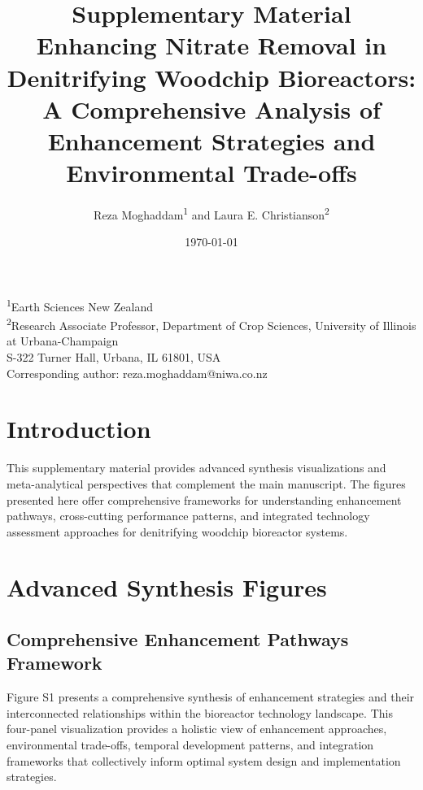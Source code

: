 \documentclass[12pt,a4paper]{article}
\title{Supplementary Material\\
\large Enhancing Nitrate Removal in Denitrifying Woodchip Bioreactors: A Comprehensive Analysis of Enhancement Strategies and Environmental Trade-offs}
\author{Reza Moghaddam\textsuperscript{1} and Laura E. Christianson\textsuperscript{2}}
\date{\today}
\begin{document}
\maketitle

\begin{center}
\footnotesize
\textsuperscript{1}Earth Sciences New Zealand\\
\textsuperscript{2}Research Associate Professor, Department of Crop Sciences, University of Illinois at Urbana-Champaign\\
S-322 Turner Hall, Urbana, IL 61801, USA\\
Corresponding author: reza.moghaddam@niwa.co.nz
\end{center}

\section{Introduction}

This supplementary material provides advanced synthesis visualizations and meta-analytical perspectives that complement the main manuscript. The figures presented here offer comprehensive frameworks for understanding enhancement pathways, cross-cutting performance patterns, and integrated technology assessment approaches for denitrifying woodchip bioreactor systems.

\section{Advanced Synthesis Figures}

\subsection{Comprehensive Enhancement Pathways Framework}

Figure S1 presents a comprehensive synthesis of enhancement strategies and their interconnected relationships within the bioreactor technology landscape. This four-panel visualization provides a holistic view of enhancement approaches, environmental trade-offs, temporal development patterns, and integration frameworks that collectively inform optimal system design and implementation strategies.
\end{document}
